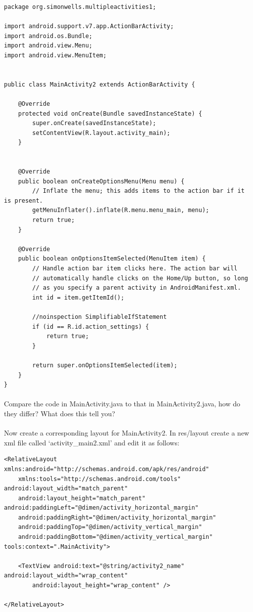 \documentclass[12pt, a4paper, twoside]{book}
\begin{document}
\begin{lstlisting}
package org.simonwells.multipleactivities1;

import android.support.v7.app.ActionBarActivity;
import android.os.Bundle;
import android.view.Menu;
import android.view.MenuItem;


public class MainActivity2 extends ActionBarActivity {

    @Override
    protected void onCreate(Bundle savedInstanceState) {
        super.onCreate(savedInstanceState);
        setContentView(R.layout.activity_main);
    }


    @Override
    public boolean onCreateOptionsMenu(Menu menu) {
        // Inflate the menu; this adds items to the action bar if it is present.
        getMenuInflater().inflate(R.menu.menu_main, menu);
        return true;
    }

    @Override
    public boolean onOptionsItemSelected(MenuItem item) {
        // Handle action bar item clicks here. The action bar will
        // automatically handle clicks on the Home/Up button, so long
        // as you specify a parent activity in AndroidManifest.xml.
        int id = item.getItemId();

        //noinspection SimplifiableIfStatement
        if (id == R.id.action_settings) {
            return true;
        }

        return super.onOptionsItemSelected(item);
    }
}
\end{lstlisting}
\paragraph{} Compare the code in MainActivity.java to that in MainActivity2.java, how do they differ? What does this tell you?

\paragraph{} Now create a corresponding layout for MainActivity2. In res/layout create a new xml file called `activity\_main2.xml' and edit it as follows:

\begin{lstlisting}
<RelativeLayout xmlns:android="http://schemas.android.com/apk/res/android"
    xmlns:tools="http://schemas.android.com/tools" android:layout_width="match_parent"
    android:layout_height="match_parent" android:paddingLeft="@dimen/activity_horizontal_margin"
    android:paddingRight="@dimen/activity_horizontal_margin"
    android:paddingTop="@dimen/activity_vertical_margin"
    android:paddingBottom="@dimen/activity_vertical_margin" tools:context=".MainActivity">

    <TextView android:text="@string/activity2_name" android:layout_width="wrap_content"
        android:layout_height="wrap_content" />

</RelativeLayout>
\end{lstlisting}
\end{document}
